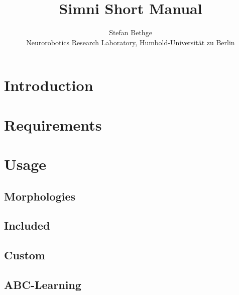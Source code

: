 \documentclass[10pt,a4paper]{article}
\begin{document}
\title{Simni Short Manual}
\author{Stefan Bethge\\
Neurorobotics Research Laboratory, Humbold-Universität zu Berlin}

\maketitle
\tableofcontents
\newpage
{}

\section{Introduction}

\section{Requirements}

\section{Usage}

\subsection{Morphologies}
\subsection{Included}
\subsection{Custom}

\subsection{ABC-Learning}
\end{document}
